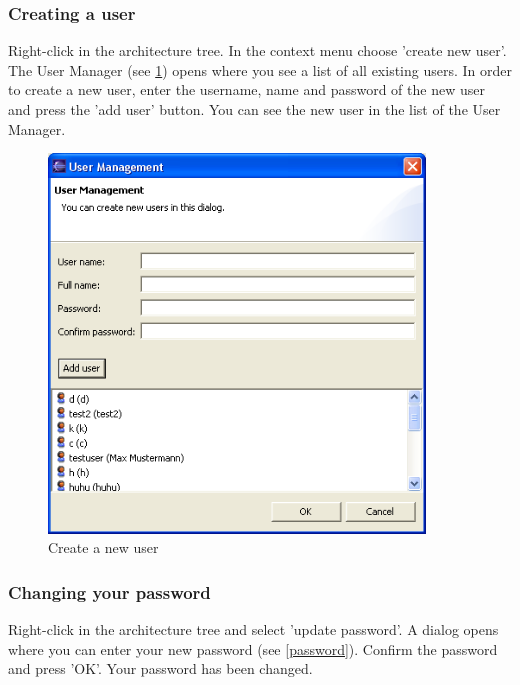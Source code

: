 \subsubsection{Creating a user}

Right-click in the architecture tree. In the context menu choose
'create new user'. The User Manager (see \ref{createuser1}) opens where you see a list of all existing users.
In order to create a new user, enter the username, name and password of the new user and press the 'add user' button.
You
can see the new user in the list of the User Manager.

\begin{figure}[h!]
\begin{center}
\includegraphics[width=10cm]{createuser1.png}
   \caption{Create a new user}
\label{createuser1}
\end{center}
\end{figure}\par


\subsubsection{Changing your password}

Right-click in the architecture tree and select 'update password'. A dialog opens where you can
enter your new password (see \ref{password}). Confirm the password and press 'OK'. Your password has been changed.

